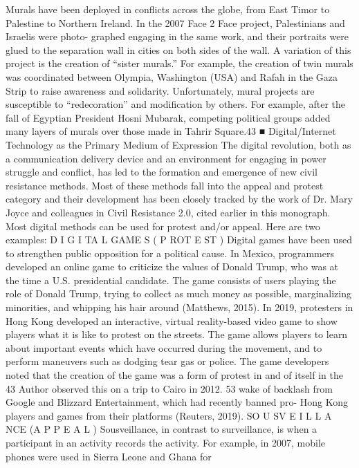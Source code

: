 \documentclass[twoside,a4paper,12pt,fleqn,openany]{extbook}
\begin{document}
Murals have been deployed in conflicts across the globe, from East Timor to Palestine
to Northern Ireland. In the 2007 Face 2 Face project, Palestinians and Israelis were photo-
graphed engaging in the same work, and their portraits were glued to the separation wall in
cities on both sides of the wall. A variation of this project is the creation of “sister murals.” For
example, the creation of twin murals was coordinated between Olympia, Washington (USA)
and Rafah in the Gaza Strip to raise awareness and solidarity. Unfortunately, mural projects
are susceptible to “redecoration” and modification by others. For example, after the fall of
Egyptian President Hosni Mubarak, competing political groups added many layers of murals
over those made in Tahrir Square.43
■ Digital/Internet Technology as the Primary Medium of Expression
The digital revolution, both as a communication delivery device and an environment for
engaging in power struggle and conflict, has led to the formation and emergence of new
civil resistance methods. Most of these methods fall into the appeal and protest category
and their development has been closely tracked by the work of Dr. Mary Joyce and colleagues
in Civil Resistance 2.0, cited earlier in this monograph. Most digital methods can be used for
protest and/or appeal. Here are two examples:
D I G I TA L GAME S ( P ROT E ST )
Digital games have been used to strengthen public opposition for a political cause. In Mexico,
programmers developed an online game to criticize the values of Donald Trump, who was
at the time a U.S. presidential candidate. The game consists of users playing the role of
Donald Trump, trying to collect as much money as possible, marginalizing minorities, and
whipping his hair around (Matthews, 2015). In 2019, protesters in Hong Kong developed an
interactive, virtual reality-based video game to show players what it is like to protest on the
streets. The game allows players to learn about important events which have occurred during
the movement, and to perform maneuvers such as dodging tear gas or police. The game
developers noted that the creation of the game was a form of protest in and of itself in the
43
 Author observed this on a trip to Cairo in 2012.
53
wake of backlash from Google and Blizzard Entertainment, which had recently banned pro-
Hong Kong players and games from their platforms (Reuters, 2019).
SO U SV E I L L A NCE (A P P E A L )
Sousveillance, in contrast to surveillance, is when a participant in an activity records the
activity. For example, in 2007, mobile phones were used in Sierra Leone and Ghana for
\end{document}
